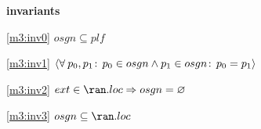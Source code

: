 \textbf{invariants}
\begin{block}
\item[ \eqref{m3:inv0} ]{$osgn \subseteq plf $} %
\item[ \eqref{m3:inv1} ]{${ \langle \forall \:p_0,p_1\!:\,  p_0 \in osgn \land p_1 \in osgn \!:\,  p_0 = p_1  \rangle } $} %
\item[ \eqref{m3:inv2} ]{$ext \in \ran.loc \implies osgn = \emptyset $} %
\item[ \eqref{m3:inv3} ]{$osgn \subseteq \ran.loc $} %
\end{block}
